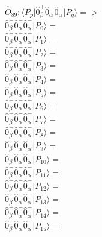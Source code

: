 \documentclass[14pt]{article}
\begin{document}
    $\hat{O}_{89}:  \langle{P_p}\vert \hat{0}_{\beta}^{+}\hat{0}_{\alpha}^{-}\hat{0}_{\alpha}^{-} \vert{P_q}\rangle => $ \\ 
    $ \hat{0}_{\beta}^{+}\hat{0}_{\alpha}^{-}\hat{0}_{\alpha}^{-} \vert{P_{0}}\rangle =  $ \\ 
    $ \hat{0}_{\beta}^{+}\hat{0}_{\alpha}^{-}\hat{0}_{\alpha}^{-} \vert{P_{1}}\rangle =  $ \\ 
    $ \hat{0}_{\beta}^{+}\hat{0}_{\alpha}^{-}\hat{0}_{\alpha}^{-} \vert{P_{2}}\rangle =  $ \\ 
    $ \hat{0}_{\beta}^{+}\hat{0}_{\alpha}^{-}\hat{0}_{\alpha}^{-} \vert{P_{3}}\rangle =  $ \\ 
    $ \hat{0}_{\beta}^{+}\hat{0}_{\alpha}^{-}\hat{0}_{\alpha}^{-} \vert{P_{4}}\rangle =  $ \\ 
    $ \hat{0}_{\beta}^{+}\hat{0}_{\alpha}^{-}\hat{0}_{\alpha}^{-} \vert{P_{5}}\rangle =  $ \\ 
    $ \hat{0}_{\beta}^{+}\hat{0}_{\alpha}^{-}\hat{0}_{\alpha}^{-} \vert{P_{6}}\rangle =  $ \\ 
    $ \hat{0}_{\beta}^{+}\hat{0}_{\alpha}^{-}\hat{0}_{\alpha}^{-} \vert{P_{7}}\rangle =  $ \\ 
    $ \hat{0}_{\beta}^{+}\hat{0}_{\alpha}^{-}\hat{0}_{\alpha}^{-} \vert{P_{8}}\rangle =  $ \\ 
    $ \hat{0}_{\beta}^{+}\hat{0}_{\alpha}^{-}\hat{0}_{\alpha}^{-} \vert{P_{9}}\rangle =  $ \\ 
    $ \hat{0}_{\beta}^{+}\hat{0}_{\alpha}^{-}\hat{0}_{\alpha}^{-} \vert{P_{10}}\rangle =  $ \\ 
    $ \hat{0}_{\beta}^{+}\hat{0}_{\alpha}^{-}\hat{0}_{\alpha}^{-} \vert{P_{11}}\rangle =  $ \\ 
    $ \hat{0}_{\beta}^{+}\hat{0}_{\alpha}^{-}\hat{0}_{\alpha}^{-} \vert{P_{12}}\rangle =  $ \\ 
    $ \hat{0}_{\beta}^{+}\hat{0}_{\alpha}^{-}\hat{0}_{\alpha}^{-} \vert{P_{13}}\rangle =  $ \\ 
    $ \hat{0}_{\beta}^{+}\hat{0}_{\alpha}^{-}\hat{0}_{\alpha}^{-} \vert{P_{14}}\rangle =  $ \\ 
    $ \hat{0}_{\beta}^{+}\hat{0}_{\alpha}^{-}\hat{0}_{\alpha}^{-} \vert{P_{15}}\rangle =  $ \\ 
    
\end{document}
